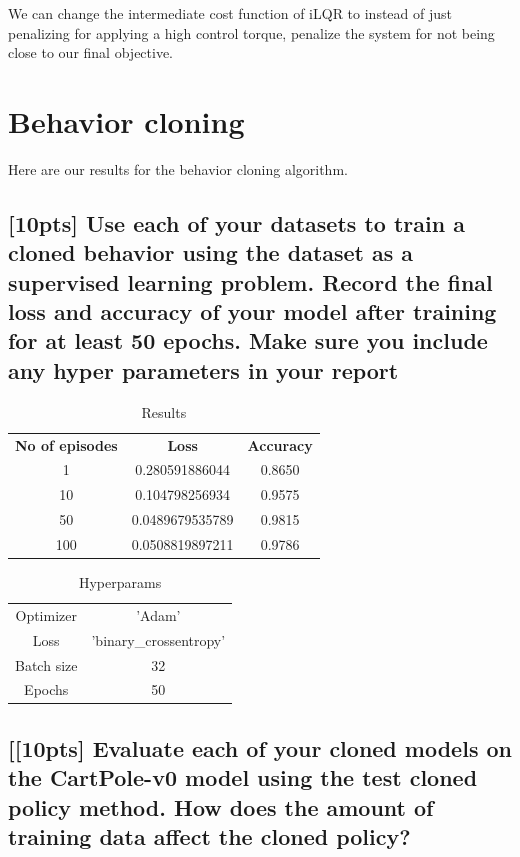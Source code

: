 \documentclass{article}
\begin{document}
We can change the intermediate cost function of iLQR to instead of just penalizing for applying a high control torque, penalize the system for not being close to our final objective. 




\section{Behavior cloning}
Here are our results for the behavior cloning algorithm. 

\subsection{[10pts] Use each of your datasets to train a cloned behavior using the dataset as a supervised learning problem. Record the final loss and accuracy of your model after training for at least 50 epochs. Make sure you include any hyper parameters in your report}

\begin{table}[H]
\centering
\caption{Results}
\label{my-label}
\begin{tabular}{ccc}
\textbf{No of episodes} & \textbf{Loss}  & \textbf{Accuracy} \\
1                       & 0.280591886044 & 0.8650    \\
10                     & 0.104798256934 & 0.9575   \\
50                     & 0.0489679535789 & 0.9815   \\
100                   & 0.0508819897211 & 0.9786
\end{tabular}
\end{table}


\begin{table}[H]
\centering
\caption{Hyperparams}
\label{my-label2}
\begin{tabular}{cc}
Optimizer  & 'Adam'                 \\
Loss       & 'binary\_crossentropy' \\
Batch size & 32                     \\
Epochs     & 50                    
\end{tabular}
\end{table}


\subsection{[[10pts] Evaluate each of your cloned models on the CartPole-v0 model using the test cloned policy method. How does the amount of training data affect the cloned policy?}
\end{document}

